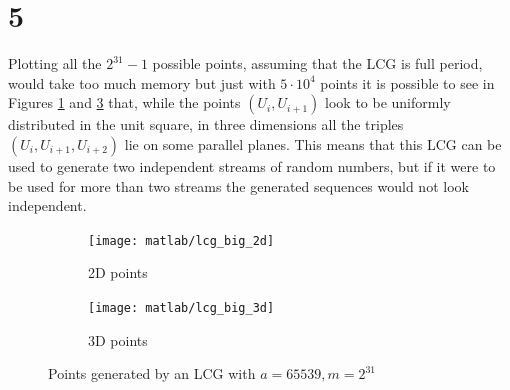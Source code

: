 \documentclass[a4paper,oneside]{article}
\begin{document}
\section*{5}
Plotting all the $2^{31} -1$ possible points, assuming that the LCG is
full period, would take too much memory but just with $5 \cdot 10^4$ points it
is possible to see in Figures \ref{plot:lcg_big_2d} and
\ref{plot:lcg_big_3d} that, while the points $(U_i, U_{i+1})$ look to
be uniformly distributed in the unit square, in three dimensions all
the triples $(U_i, U_{i+1}, U_{i+2})$ lie on some parallel
planes. This means that this LCG can be used to generate two
independent streams of random numbers, but if it were to be used for
more than two streams the generated sequences would not look
independent.
\begin{figure}[htbp]
  \centering
  \begin{subfigure}{0.5\textwidth}
    \centering
    \texttt{[image: matlab/lcg\_big\_2d]}
    \caption{2D points}
    \label{plot:lcg_big_2d}
  \end{subfigure}%
  \begin{subfigure}{0.5\textwidth}
    \centering
    \texttt{[image: matlab/lcg\_big\_3d]}
    \caption{3D points}
    \label{plot:lcg_big_3d}
  \end{subfigure}
  \caption{Points generated by an LCG with $a = 65539, m = 2^{31}$}
\end{figure}
\end{document}
